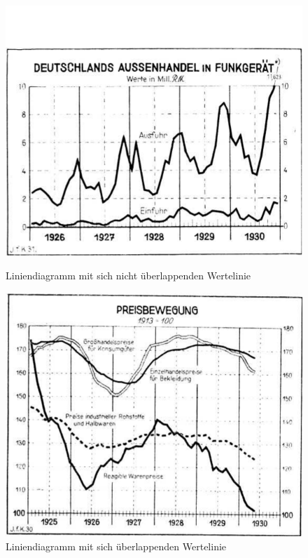 \begin{figure}[h!]
    \vspace{0.75em}

    \begin{minipage}{0.475\textwidth} %
        \centering
        \includegraphics[width=\linewidth]{Methodik/img/linebank_non_overlapping.png}
        \caption{ Liniendiagramm mit sich nicht überlappenden Wertelinie}
        \label{fig:linebank_non_overlapping}
    \end{minipage}\hfill %
    \begin{minipage}{0.475\textwidth} %
        \centering
        \includegraphics[width=\linewidth]{Methodik/img/linebank_overlapping.png}
        \caption{ Liniendiagramm mit sich überlappenden Wertelinie}
        \label{fig:linebank_overlapping}
    \end{minipage}
\end{figure}
